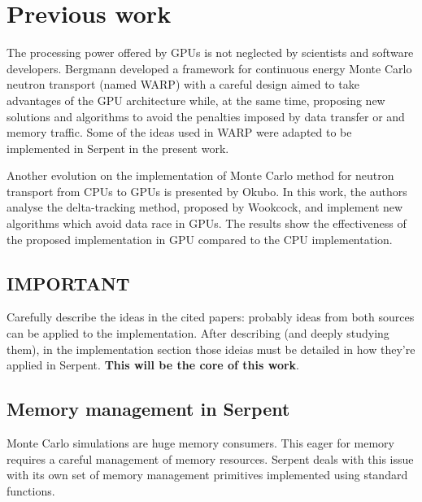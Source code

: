 \documentclass[twoside,a4paper,12pt,english,draft]{anstrans}
\begin{document}
\section{Previous work}

The processing power offered by GPUs is not neglected by scientists and software developers.
Bergmann\cite{Bergmann2014} developed a framework for continuous energy Monte Carlo neutron
transport (named WARP) with a careful design aimed to take advantages of the GPU architecture while, at the
same time, proposing new solutions and algorithms to avoid the penalties imposed by data transfer
or and memory traffic. Some of the ideas used in WARP were adapted to be implemented in Serpent in
the present work.

Another evolution on the implementation of Monte Carlo method for neutron transport from CPUs to GPUs
is presented by Okubo\cite{Okubo2016}. In this work, the authors analyse the delta-tracking method,
proposed by Wookcock\cite{Woodcock1965}, and implement new algorithms which avoid data race in
GPUs. The results show the effectiveness of the proposed implementation in GPU compared to the CPU
implementation.


\subsection{IMPORTANT}
Carefully describe the ideas in the cited papers: probably ideas from both sources can be applied to
the implementation. After describing (and deeply studying them), in the implementation section those
ideias must be detailed in how they're applied in Serpent. \textbf{This will be the core of this work}.

\subsection{Memory management in Serpent}

Monte Carlo simulations are huge memory consumers. This eager for memory requires a careful
management of memory resources. Serpent deals with this issue with its own set of memory
management primitives implemented using standard functions.
\end{document}
